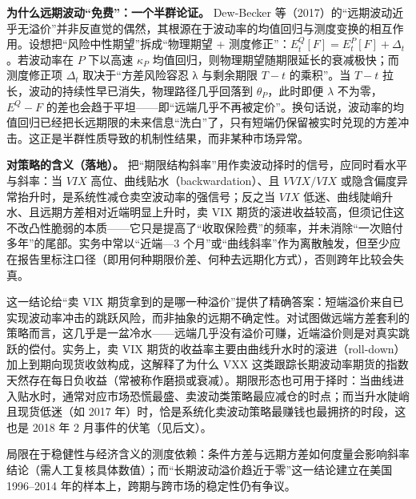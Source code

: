 \documentclass[11pt,a4paper]{ctexart}
\begin{document}
\textbf{为什么远期波动“免费”：一个半群论证。} Dew-Becker 等（2017）的“远期波动近乎无溢价”并非反直觉的偶然，其根源在于波动率的均值回归与测度变换的相互作用。设想把“风险中性期望”拆成“物理期望 + 测度修正”：$E^Q_t[F]=E^P_t[F]+\Delta_t$。若波动率在 $P$ 下以高速 $\kappa_P$ 均值回归，则物理期望随期限延长的衰减极快；而测度修正项 $\Delta_t$ 取决于“方差风险容忍 λ 与剩余期限 $T-t$ 的乘积”。当 $T-t$ 拉长，波动的持续性早已消失，物理路径几乎回落到 $\theta_P$，此时即便 $\lambda$ 不为零，$E^Q-F$ 的差也会趋于平坦——即“远端几乎不再被定价”。换句话说，波动率的均值回归已经把长远期限的未来信息“洗白”了，只有短端仍保留被实时兑现的方差冲击。这正是半群性质导致的机制性结果，而非某种市场异常。

\textbf{对策略的含义（落地）。} 把“期限结构斜率”用作卖波动择时的信号，应同时看水平与斜率：当 $VIX$ 高位、曲线贴水（backwardation）、且 $VVIX/VIX$ 或隐含偏度异常抬升时，是系统性减仓卖空波动率的强信号；反之当 $VIX$ 低迷、曲线陡峭升水、且远期方差相对近端明显上升时，卖 VIX 期货的滚进收益较高，但须记住这不改凸性脆弱的本质——它只是提高了“收取保险费”的频率，并未消除“一次赔付多年”的尾部。实务中常以“近端—3 个月”或“曲线斜率”作为离散触发，但至少应在报告里标注口径（即用何种期限价差、何种去远期化方式），否则跨年比较会失真。

这一结论给“卖 VIX 期货拿到的是哪一种溢价”提供了精确答案：短端溢价来自已实现波动率冲击的跳跃风险，而非抽象的远期不确定性。对试图做远端方差套利的策略而言，这几乎是一盆冷水——远端几乎没有溢价可赚，近端溢价则是对真实跳跃的偿付。实务上，卖 VIX 期货的收益率主要由曲线升水时的滚进（roll-down）加上到期向现货收敛构成，这解释了为什么 VXX 这类跟踪长期波动率期货的指数天然存在每日负收益（常被称作磨损或衰减）。期限形态也可用于择时：当曲线进入贴水时，通常对应市场恐慌最盛、卖波动类策略最应减仓的时点；而当升水陡峭且现货低迷（如 2017 年）时，恰是系统化卖波动策略最赚钱也最拥挤的时段，这也是 2018 年 2 月事件的伏笔（见后文）。

局限在于稳健性与经济含义的测度依赖：条件方差与远期方差如何度量会影响斜率结论（需人工复核具体数值）；而“长期波动溢价趋近于零”这一结论建立在美国 1996–2014 年的样本上，跨期与跨市场的稳定性仍有争议。
\end{document}
